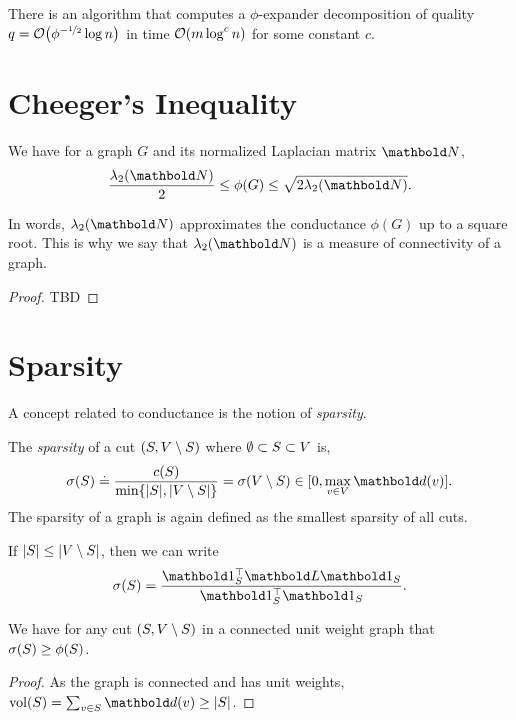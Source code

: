 \begin{thm}
There is an algorithm that computes a $\phi$-expander decomposition of quality $q = \LandauO{\phi^{-\nicefrac{1}{2}} \log n}$ in time $\LandauO{m \log^c n}$ for some constant $c$.
\end{thm}

\section{Cheeger's Inequality}

\begin{thm} We have for a graph $G$ and its normalized Laplacian matrix $\mN$, \begin{align}
    \frac{\lambda_2(\mN)}{2} \leq \phi(G) \leq \sqrt{2 \lambda_2(\mN)}.
\end{align}
\end{thm}\noindent In words, $\lambda_2(\mN)$ approximates the conductance $\phi(G)$ up to a square root. This is why we say that $\lambda_2(\mN)$ is a measure of connectivity of a graph.

\begin{proof}
TBD
\end{proof}

\section{Sparsity}

A concept related to conductance is the notion of \emph{sparsity}.

\begin{defn}[Sparsity] The \emph{sparsity} of a cut $(S, V \setminus S)$ where $\emptyset \subset S \subset V$ is, \begin{align}
    \sigma(\sS) \defeq \frac{c(\sS)}{\min\{|\sS|, |\sV \setminus \sS|\}} = \sigma(\sV \setminus \sS) \in [0, \max_{v \in \sV} \vd(v)].
\end{align} The sparsity of a graph is again defined as the smallest sparsity of all cuts.
\end{defn}
\begin{rmk}
If $|S| \leq |V \setminus S|$, then we can write \begin{align}
    \sigma(\sS) = \frac{\trans{\vOne_\sS}\mL\vOne_\sS}{\trans{\vOne_\sS}\vOne_\sS}.
\end{align}
\end{rmk}

\begin{lem}
We have for any cut $(S, V \setminus S)$ in a connected unit weight graph that $\sigma(S) \geq \phi(S)$.
\end{lem}
\begin{proof}
As the graph is connected and has unit weights, $\vol(\sS) = \sum_{v \in \sS} \vd(v) \geq |\sS|$.
\end{proof}

